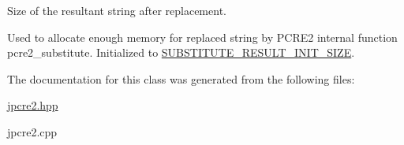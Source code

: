Size of the resultant string after replacement. 

Used to allocate enough memory for replaced string by P\+C\+R\+E2 internal function pcre2\+\_\+substitute. Initialized to \hyperlink{namespacejpcre2_a80cb201f2e733137b22a8ed98465096a_a80cb201f2e733137b22a8ed98465096a}{S\+U\+B\+S\+T\+I\+T\+U\+T\+E\+\_\+\+R\+E\+S\+U\+L\+T\+\_\+\+I\+N\+I\+T\+\_\+\+S\+I\+ZE}. 

The documentation for this class was generated from the following files\+:\begin{DoxyCompactItemize}
\item 
\hyperlink{jpcre2_8hpp}{jpcre2.\+hpp}\item 
jpcre2.\+cpp\end{DoxyCompactItemize}
